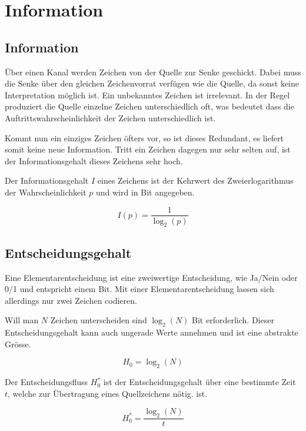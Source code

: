 \section{Information}

\subsection{Information}
 
Über einen Kanal werden Zeichen von der Quelle zur Senke geschickt. Dabei muss die Senke über den gleichen Zeichenvorrat verfügen wie die Quelle, da sonst keine Interpretation möglich ist. Ein unbekanntes Zeichen ist irrelevant. In der Regel produziert die Quelle einzelne Zeichen unterschiedlich oft, was bedeutet dass die Auftrittswahrscheinlichkeit der Zeichen unterschiedlich ist. 

Kommt nun ein einziges Zeichen öfters vor, so ist dieses Redundant, es liefert somit keine neue Information. Tritt ein Zeichen dagegen nur sehr selten auf, ist der Informationsgehalt dieses Zeichens sehr hoch. 

Der Informationsgehalt $I$ eines Zeichens ist der Kehrwert des Zweierlogarithmus der Wahrscheinlichkeit $p$ und wird in Bit angegeben.

\begin{displaymath}
I(p)=\frac{1}{\log_2(p)}
\end{displaymath}


\subsection{Entscheidungsgehalt}

Eine Elementarentscheidung ist eine zweiwertige Entscheidung, wie Ja/Nein oder 0/1 und entspricht einem Bit. Mit einer Elementarentscheidung lassen sich allerdings nur zwei Zeichen codieren. 

Will man $N$ Zeichen unterscheiden sind $\log_2(N)$ Bit erforderlich. Dieser Entscheidungsgehalt kann auch ungerade Werte annehmen und ist eine abstrakte Grösse.

\begin{displaymath}
H_0=\log_2(N)
\end{displaymath}

Der Entscheidungsfluss $H^*_0$ ist der Entscheidungsgehalt über eine bestimmte Zeit $t$, welche zur Übertragung eines Quellzeichens nötig. ist.

\begin{displaymath}
H^*_0=\frac{\log_2(N)}{t}
\end{displaymath}


